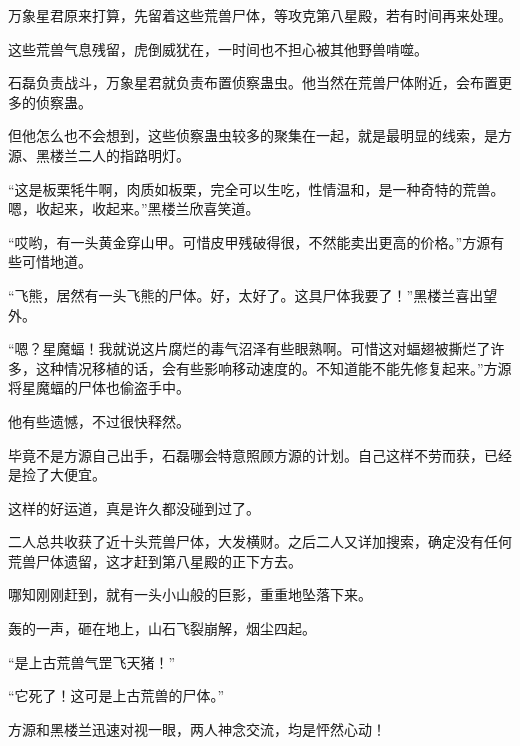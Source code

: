 \begin{this_body}
万象星君原来打算，先留着这些荒兽尸体，等攻克第八星殿，若有时间再来处理。

这些荒兽气息残留，虎倒威犹在，一时间也不担心被其他野兽啃噬。

石磊负责战斗，万象星君就负责布置侦察蛊虫。他当然在荒兽尸体附近，会布置更多的侦察蛊。

但他怎么也不会想到，这些侦察蛊虫较多的聚集在一起，就是最明显的线索，是方源、黑楼兰二人的指路明灯。

“这是板栗牦牛啊，肉质如板栗，完全可以生吃，性情温和，是一种奇特的荒兽。嗯，收起来，收起来。”黑楼兰欣喜笑道。

“哎哟，有一头黄金穿山甲。可惜皮甲残破得很，不然能卖出更高的价格。”方源有些可惜地道。

“飞熊，居然有一头飞熊的尸体。好，太好了。这具尸体我要了！”黑楼兰喜出望外。

“嗯？星魔蝠！我就说这片腐烂的毒气沼泽有些眼熟啊。可惜这对蝠翅被撕烂了许多，这种情况移植的话，会有些影响移动速度的。不知道能不能先修复起来。”方源将星魔蝠的尸体也偷盗手中。

他有些遗憾，不过很快释然。

毕竟不是方源自己出手，石磊哪会特意照顾方源的计划。自己这样不劳而获，已经是捡了大便宜。

这样的好运道，真是许久都没碰到过了。

二人总共收获了近十头荒兽尸体，大发横财。之后二人又详加搜索，确定没有任何荒兽尸体遗留，这才赶到第八星殿的正下方去。

哪知刚刚赶到，就有一头小山般的巨影，重重地坠落下来。

轰的一声，砸在地上，山石飞裂崩解，烟尘四起。

“是上古荒兽气罡飞天猪！”

“它死了！这可是上古荒兽的尸体。”

方源和黑楼兰迅速对视一眼，两人神念交流，均是怦然心动！

\end{this_body}

